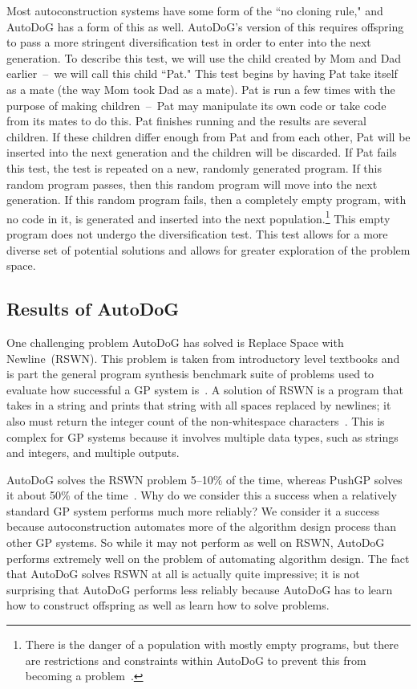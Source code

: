 \documentclass{sig-alternate}
\begin{document}
Most autoconstruction systems have some form of the ``no cloning rule," and AutoDoG has a form of this as well. AutoDoG's version of this requires offspring to pass a more stringent diversification test in order to enter into the next generation. To describe this test, we will use the child created by Mom and Dad earlier~--~we will call this child ``Pat." This test begins by having Pat take itself as a mate (the way Mom took Dad as a mate). Pat is run a few times with the purpose of making children~--~Pat may manipulate its own code or take code from its mates to do this. Pat finishes running and the results are several children. If these children differ enough from Pat and from each other, Pat will be inserted into the next generation and the children will be discarded. If Pat fails this test, the test is repeated on a new, randomly generated program. If this random program passes, then this random program will move into the next generation. If this random program fails, then a completely empty program, with no code in it, is generated and inserted into the next population.\footnote{There is the danger of a population with mostly empty programs, but there are restrictions and constraints within AutoDoG to prevent this from becoming a problem~\cite{spector:2016}.} This empty program does not undergo the diversification test.
This test allows for a more diverse set of potential solutions and allows for greater exploration of the problem space.~\cite{spector:2016}

\subsection{Results of AutoDoG}
\label{sec:results}
One challenging problem AutoDoG has solved is Replace Space with Newline~(RSWN). This problem is taken from introductory level textbooks and is part the general program synthesis benchmark suite of problems used to evaluate how successful a GP system is~\cite{helmuth:2015}. A solution of RSWN is a program that takes in a string and prints that string with all spaces replaced by newlines; it also must return the integer count of the non-whitespace characters~\cite{helmuth:2015}. This is complex for GP systems because it involves multiple data types, such as strings and integers, and multiple outputs.

AutoDoG solves the RSWN problem 5--10\% of the time, whereas PushGP solves it about 50\% of the time~\cite{helmuth:2015}. Why do we consider this a success when a relatively standard GP system performs much more reliably? We consider it a success because autoconstruction automates more of the algorithm design process than other GP systems. So while it may not perform as well on RSWN, AutoDoG performs extremely well on the problem of automating algorithm design. The fact that AutoDoG solves RSWN at all is actually quite impressive; it is not surprising that AutoDoG performs less reliably because AutoDoG has to learn how to construct offspring as well as learn how to solve problems.
\end{document}
